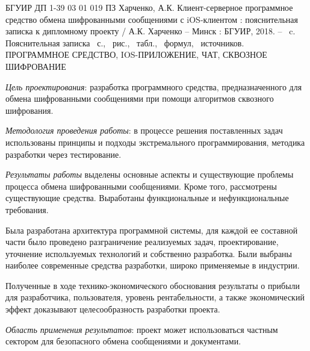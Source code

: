 \thispagestyle{empty}


БГУИР ДП 1-39 03 01 019 ПЗ
\bigbreak
Харченко, А.К. Клиент-серверное программное средство обмена шифрованными сообщениями с iOS-клиентом : пояснительная записка к дипломному проекту / А.К. Харченко -- Минск : БГУИР, 2018. -- \totalpages~c.
\bigbreak
Пояснительная записка \totalpages~с., \totfig{}~рис., \tottab{}~табл., \toteq{}~формул, \totref{}~источников.
\bigbreak
\MakeUppercase{Программное средство, iOS-приложение, чат, сквозное шифрование}
\bigbreak

\textit{Цель проектирования}: разработка программного средства, предназначенного для обмена шифрованными сообщениями при помощи алгоритмов сквозного шифрования. 

\textit{Методология проведения работы}: в процессе решения поставленных задач использованы принципы и подходы экстремального программирования, методика разработки через тестирование.

\textit{Результаты работы} выделены основные аспекты и существующие проблемы процесса обмена шифрованными сообщениями. Кроме того, рассмотрены существующие средства. Выработаны функциональные и нефункциональные требования.

Была разработана архитектура программной системы, для каждой ее составной части было проведено разграничение реализуемых задач, проектирование, уточнение используемых технологий и собственно разработка. Были выбраны наиболее современные средства разработки, широко применяемые в индустрии. 

Полученные в ходе технико-экономического обоснования результаты о прибыли для разработчика, пользователя, уровень рентабельности, а также экономический эффект доказывают целесообразность разработки про\-екта.

\textit{Область применения результатов}: проект может использоваться частным сектором для безопасного обмена сообщениями и документами.